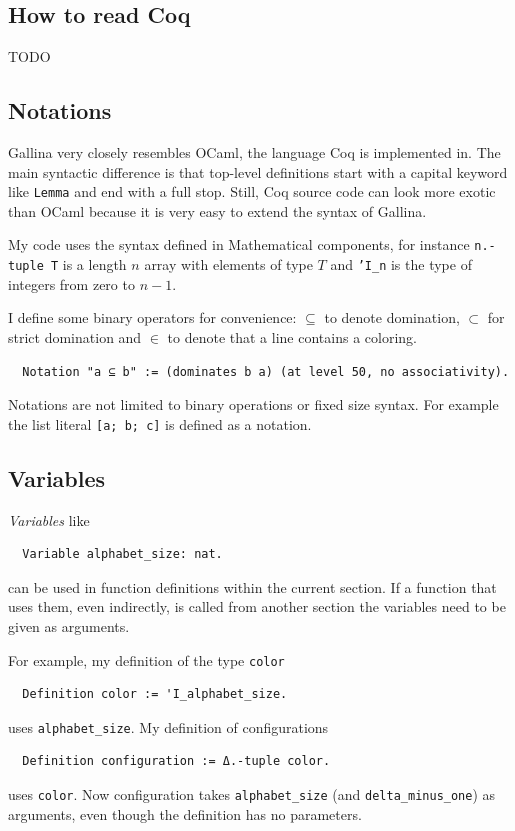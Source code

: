 \documentclass[english, 12pt, a4paper, sci, a-1b, online]{aaltothesis}
\newcommand\icoq[1]{\texttt{#1}}
\begin{document}
\subsection{How to read Coq}

TODO

\subsection{Notations}

Gallina very closely resembles OCaml, the language Coq is implemented in. The main syntactic difference is that top-level definitions start with a capital keyword like \icoq{Lemma} and end with a full stop. Still, Coq source code can look more exotic than OCaml because it is very easy to extend the syntax of Gallina.

My code uses the syntax defined in Mathematical components, for instance \icoq{n.-tuple T} is a length $n$ array with elements of type $T$ and \icoq{'I_n} is the type of integers from zero to $n-1$.

I define some binary operators for convenience: $\subseteq$ to denote domination, $\subset$ for strict domination and $\in$ to denote that a line contains a coloring.
\begin{verbatim}
  Notation "a ⊆ b" := (dominates b a) (at level 50, no associativity).
\end{verbatim}

Notations are not limited to binary operations or fixed size syntax. For example the list literal \icoq{[a; b; c]} is defined as a notation.

\subsection{Variables}

\emph{Variables} like
\begin{verbatim}
  Variable alphabet_size: nat.
\end{verbatim}
can be used in function definitions within the current section. If a function that uses them, even indirectly, is called from another section the variables need to be given as arguments.

For example, my definition of the type \icoq{color}
\begin{verbatim}
  Definition color := 'I_alphabet_size.
\end{verbatim}
uses \icoq{alphabet_size}. My definition of configurations
\begin{verbatim}
  Definition configuration := Δ.-tuple color.
\end{verbatim}
uses \icoq{color}. Now configuration takes \icoq{alphabet_size} (and \icoq{delta_minus_one}) as arguments, even though the definition has no parameters.
\end{document}
